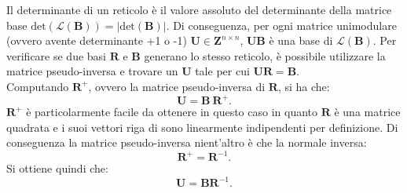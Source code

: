 Il determinante di un reticolo è il valore assoluto del 
determinante della matrice base 
$\text{det}(\mathcal{L}(\mathbf{B})) = |\text{det}(\mathbf{B})|$. 
Di conseguenza, per ogni matrice unimodulare (ovvero avente determinante +1 o -1) 
$\mathbf{U} \in \mathbf{Z}^{n \times n}$, $\mathbf{U}\mathbf{B}$ è una base di 
$\mathcal{L}(\mathbf{B})$. Per verificare se due basi $\mathbf{R}$ e $\mathbf{B}$ generano
lo stesso reticolo, è possibile utilizzare la matrice pseudo-inversa e trovare un $\mathbf{U}$
tale per cui $\mathbf{U}\mathbf{R} = \mathbf{B}$.
\\
Computando $\mathbf{R}^+$, ovvero la matrice pseudo-inversa di $\mathbf{R}$, si ha che:
\[
    \mathbf{U} = \mathbf{B} \ \mathbf{R}^+.
\]
$\mathbf{R}^+$ è particolarmente facile da ottenere in questo caso in quanto $\mathbf{R}$ è 
una matrice quadrata e i suoi vettori
riga di sono linearmente indipendenti per definizione.
Di conseguenza la matrice pseudo-inversa nient'altro è che la normale inversa:
\[
    \mathbf{R}^+ = \mathbf{R}^{-1}.
\]
Si ottiene quindi che:
\[
    \mathbf{U} = \mathbf{B}\mathbf{R}^{-1}.
\]


